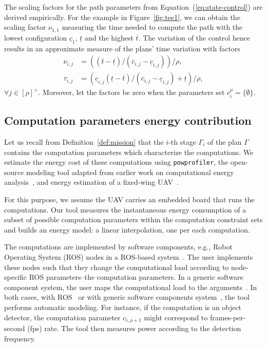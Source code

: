 \documentclass[letterpaper,10pt,conference]{ieeeconf}
\newcommand{\stt}[1]{{\small\tt #1}} %
\newcommand{\powprof}{\stt{powprofiler}}
\theoremstyle{definition}
\begin{document}
The scaling factors for the path parameters from Equation~(\ref{eq:state-control}) are derived empirically. For the example in Figure~\ref{fig:tee1}, we can obtain the scaling factor $\nu_{1,1}$ measuring the time needed to compute the path with the lowest configuration $\underline{c}_1$, $\underline{t}$ and the highest $\overline{t}$. The variation of the control hence results in an approximate measure of the plans' time variation with factors
\begin{equation}\label{eq:scale-traj}\begin{split}
  \nu_{i,j}&=\left((\overline{t}-\underline{t})/(\overline{c}_{i,j}-\underline{c}_{i,j})\right)/\rho,\\
  \tau_{i,j}&=\left(\underline{c}_{i,j}(\underline{t}-\overline{t})/(\overline{c}_{i,j}-\underline{c}_{i,j})+\underline{t}\right)/\rho,
\end{split}\end{equation} 
$\forall j\in[\rho]^+$. Moreover, let the factors be zero when the parameters set $c_i^\rho=\{\emptyset\}$.

\subsection{Computation parameters energy contribution}
\label{sec:computations-model}

Let us recall from Definition~\ref{def:mission} that the $i$-th stage $\Gamma_i$ of the plan $\Gamma$ contains the computation parameters which characterize the computations. We estimate the energy cost of these computations using \powprof{}, the open-source modeling tool adapted from earlier work on computational energy analysis~\cite{seewald2019coarse, seewald2019component}, and energy estimation of a fixed-wing UAV~\cite{seewald2020mechanical}. 

For this purpose, we assume the UAV carries an embedded board that runs the computations. Our tool measures the instantaneous energy consumption of a subset of possible computation parameters within the computation constraint sets and builds an energy model: a linear interpolation, one per each computation. 

The computations are implemented by software components, e.g., Robot Operating System (ROS) nodes in a ROS-based system~\cite{quigley2009ros}. The user implements these nodes such that they change the computational load according to node-specific ROS parameters--the computation parameters. In a generic software component system, the user maps the computational load to the arguments~\cite{seewald2019component}. In both cases, with ROS~\cite{zamanakos2020energy} or with generic software components system~\cite{seewald2019component}, the tool performs automatic modeling. For instance, if the computation is an object detector, the computation parameter $c_{i,\rho+1}$ might correspond to frames-per-second (fps) rate. The tool then measures power according to the detection frequency.
\end{document}
